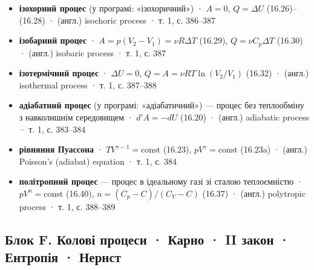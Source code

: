\documentclass[11pt,a4paper,oneside]{book}
\newcommand{\book}{}
\begin{document}
\begin{itemize}
\item \textbf{ізохорний процес} (у програмі: «ізохоричний») · $A = 0$, $Q = \Delta U$ (16.26)–(16.28) · (англ.) isochoric process · \book{} т. 1, с. 386–387
\item \textbf{ізобарний процес} · $A = p(V_2-V_1) = \nu R\Delta T$ (16.29), $Q = \nu C_p\Delta T$ (16.30) · (англ.) isobaric process · \book{} т. 1, с. 387
\item \textbf{ізотермічний процес} · $\Delta U = 0$, $Q = A = \nu RT\ln(V_2/V_1)$ (16.32) · (англ.) isothermal process · \book{} т. 1, с. 387–388
\item \textbf{адіабатний процес} (у програмі: «адіабатичний») — процес без теплообміну з навколишнім середовищем · $d\text{'}A = -dU$ (16.20) · (англ.) adiabatic process · \book{} т. 1, с. 383–384
\item \textbf{рівняння Пуассона} · $TV^{\gamma-1} = \text{const}$ (16.23), $pV^\gamma = \text{const}$ (16.23a) · (англ.) Poisson's (adiabat) equation · \book{} т. 1, с. 384
\item \textbf{політропний процес} — процес в ідеальному газі зі сталою теплоємністю · $pV^n = \text{const}$ (16.40), $n = (C_p - C)/(C_V - C)$ (16.37) · (англ.) polytropic process · \book{} т. 1, с. 388–389
\end{itemize}

\subsection*{Блок F. Колові процеси · Карно · II закон · Ентропія · Нернст}
\end{document}
